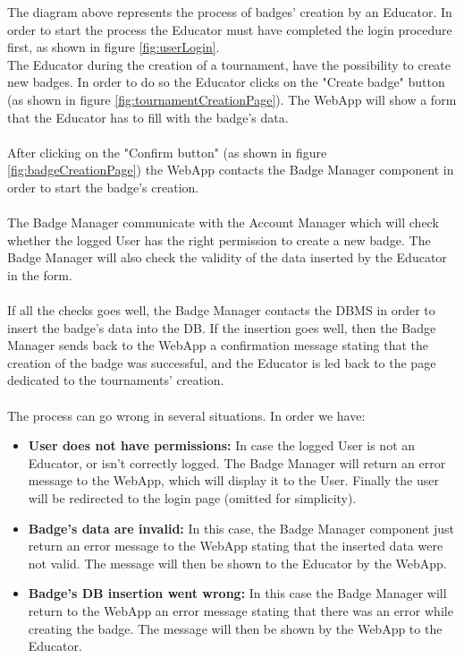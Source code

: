 \documentclass{article}
\begin{document}
{        The diagram above represents the process of badges' creation by an Educator.
        In order to start the process the Educator must have completed the login procedure first,
        as shown in figure \ref{fig:userLogin}. \\
        The Educator during the creation of a tournament, have the possibility to create new badges.
        In order to do so the Educator clicks on the "Create badge" button (as shown in figure
        \ref{fig:tournamentCreationPage}). The WebApp will show a form that the Educator has to fill
        with the badge's data. \\ \\
        After clicking on the "Confirm button" (as shown in figure \ref{fig:badgeCreationPage})
        the WebApp contacts the Badge Manager component in order to start the badge's creation.
        \\ \\
        The Badge Manager communicate with the Account Manager which will check whether the 
        logged User has the right permission to create a new badge. The Badge Manager will also
        check the validity of the data inserted by the Educator in the form.
        \\ \\
        If all the checks goes well, the Badge Manager contacts the DBMS in order to insert the
        badge's data into the DB.
        If the insertion goes well, then the Badge Manager sends back to the WebApp a confirmation
        message stating that the creation of the badge was successful, and the Educator is led back
        to the page dedicated to the tournaments' creation.
        \\ \\
        The process can go wrong in several situations. In order we have:
        \begin{itemize}
            \item \textbf{User does not have permissions:} In case the logged User is not an
            Educator, or isn't correctly logged. The Badge Manager will return an
            error message to the WebApp, which will display it to the User.
            Finally the user will be redirected to the login page (omitted for simplicity).
            \item \textbf{Badge's data are invalid:} In this case, the Badge Manager component 
            just return an error message to the WebApp stating that the inserted data were not 
            valid. The message will then be shown to the Educator by the WebApp.
            \item \textbf{Badge's DB insertion went wrong:} In this case the Badge Manager will 
            return to the WebApp an error message stating that there was an error while creating 
            the badge. The message will then be shown by the WebApp to the Educator.
        \end{itemize}

}
\end{document}
